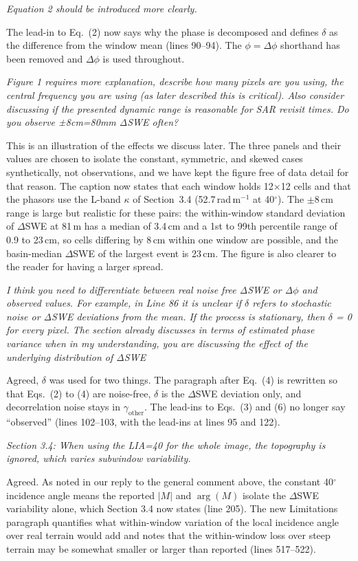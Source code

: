 \documentclass[tc, manuscript]{copernicus}
\begin{document}
\textit{Equation 2 should be introduced more clearly.}

The lead-in to Eq.~(2) now says why the phase is decomposed and defines $\delta$ as the difference from the window mean (lines 90--94). The $\phi = \Delta\phi$ shorthand has been removed and $\Delta\phi$ is used throughout.

\textit{Figure 1 requires more explanation, describe how many pixels are you using, the central frequency you are using (as later described this is critical). Also consider discussing if the presented dynamic range is reasonable for SAR revisit times. Do you observe ±8cm=80mm ΔSWE often?}

This is an illustration of the effects we discuss later. The three panels and their values are chosen to isolate the constant, symmetric, and skewed cases synthetically, not observations, and we have kept the figure free of data detail for that reason. The caption now states that each window holds 12$\times$12 cells and that the phasors use the L-band $\kappa$ of Section~3.4 (52.7\,rad\,m$^{-1}$ at 40$^\circ$). The $\pm8$\,cm range is large but realistic for these pairs: the within-window standard deviation of $\Delta$SWE at 81\,m has a median of 3.4\,cm and a 1st to 99th percentile range of 0.9 to 23\,cm, so cells differing by 8\,cm within one window are possible, and the basin-median $\Delta$SWE of the largest event is 23\,cm. The figure is also clearer to the reader for having a larger spread.

\textit{ I think you need to differentiate between real noise free ΔSWE or Δ$\phi$ and observed values. For example, in Line 86 it is unclear if $\delta$ refers to stochastic noise or ΔSWE deviations from the mean. If the process is stationary, then $\delta$ = 0 for every pixel. The section already discusses in terms of estimated phase variance when in my understanding, you are discussing the effect of the underlying distribution of ΔSWE}

Agreed, $\delta$ was used for two things. The paragraph after Eq.~(4) is rewritten so that Eqs.~(2) to (4) are noise-free, $\delta$ is the $\Delta$SWE deviation only, and decorrelation noise stays in $\gamma_\mathrm{other}$. The lead-ins to Eqs.~(3) and (6) no longer say ``observed'' (lines 102--103, with the lead-ins at lines 95 and 122).

\textit{Section 3.4: When using the LIA=40 for the whole image, the topography is ignored, which varies subwindow variability.}

Agreed. As noted in our reply to the general comment above, the constant 40$^\circ$ incidence angle means the reported $|M|$ and $\arg(M)$ isolate the $\Delta$SWE variability alone, which Section 3.4 now states (line 205). The new Limitations paragraph quantifies what within-window variation of the local incidence angle over real terrain would add and notes that the within-window loss over steep terrain may be somewhat smaller or larger than reported (lines 517--522).
\end{document}
